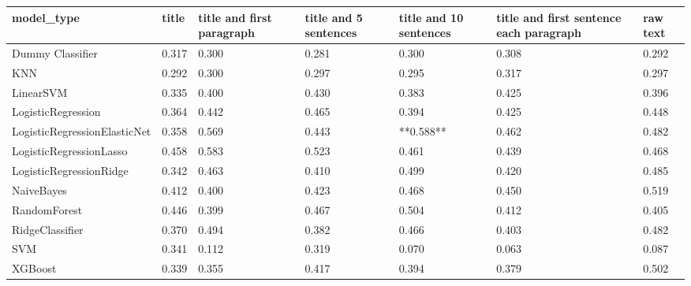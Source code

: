 \begin{tabular}{lllllll}
\toprule
                  model\_type & title & title and first paragraph & title and 5 sentences & title and 10 sentences & title and first sentence each paragraph & raw text \\
\midrule
            Dummy Classifier & 0.317 &                     0.300 &                 0.281 &                  0.300 &                                   0.308 &    0.292 \\
                         KNN & 0.292 &                     0.300 &                 0.297 &                  0.295 &                                   0.317 &    0.297 \\
                   LinearSVM & 0.335 &                     0.400 &                 0.430 &                  0.383 &                                   0.425 &    0.396 \\
          LogisticRegression & 0.364 &                     0.442 &                 0.465 &                  0.394 &                                   0.425 &    0.448 \\
LogisticRegressionElasticNet & 0.358 &                     0.569 &                 0.443 &              **0.588** &                                   0.462 &    0.482 \\
     LogisticRegressionLasso & 0.458 &                     0.583 &                 0.523 &                  0.461 &                                   0.439 &    0.468 \\
     LogisticRegressionRidge & 0.342 &                     0.463 &                 0.410 &                  0.499 &                                   0.420 &    0.485 \\
                  NaiveBayes & 0.412 &                     0.400 &                 0.423 &                  0.468 &                                   0.450 &    0.519 \\
                RandomForest & 0.446 &                     0.399 &                 0.467 &                  0.504 &                                   0.412 &    0.405 \\
             RidgeClassifier & 0.370 &                     0.494 &                 0.382 &                  0.466 &                                   0.403 &    0.482 \\
                         SVM & 0.341 &                     0.112 &                 0.319 &                  0.070 &                                   0.063 &    0.087 \\
                     XGBoost & 0.339 &                     0.355 &                 0.417 &                  0.394 &                                   0.379 &    0.502 \\
\bottomrule
\end{tabular}
